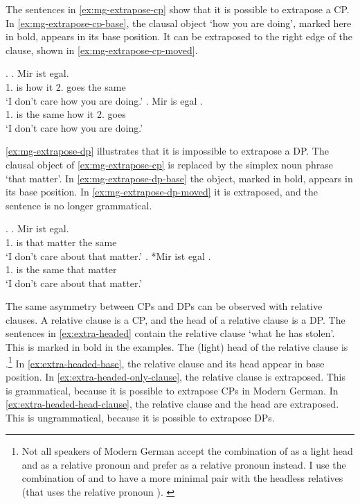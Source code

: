 The sentences in \ref{ex:mg-extrapose-cp} show that it is possible to extrapose a CP. In \ref{ex:mg-extrapose-cp-base}, the clausal object  `how you are doing', marked here in bold, appears in its base position. It can be extraposed to the right edge of the clause, shown in \ref{ex:mg-extrapose-cp-moved}.

\ex.\label{ex:mg-extrapose-cp}
\ag. Mir ist     egal.\\
1. is how it 2. goes {the same}\\
`I don't care how you are doing.'\label{ex:mg-extrapose-cp-base}
\bg. Mir is egal    .\\
1. is {the same} how it 2. goes\\
`I don't care how you are doing.' \label{ex:mg-extrapose-cp-moved}

\ref{ex:mg-extrapose-dp} illustrates that it is impossible to extrapose a DP. The clausal object of \ref{ex:mg-extrapose-cp} is replaced by the simplex noun phrase  `that matter'.
In \ref{ex:mg-extrapose-dp-base} the object, marked in bold, appears in its base position. In \ref{ex:mg-extrapose-dp-moved} it is extraposed, and the sentence is no longer grammatical.

\ex.\label{ex:mg-extrapose-dp}
\ag. Mir ist   egal.\\
1. is that matter {the same}\\
`I don't care about that matter.'\label{ex:mg-extrapose-dp-base}
\bg. *Mir ist egal  .\\
1. is {the same} that matter\\
`I don't care about that matter.' \label{ex:mg-extrapose-dp-moved}

The same asymmetry between CPs and DPs can be observed with relative clauses. A relative clause is a CP, and the head of a relative clause is a DP. The sentences in \ref{ex:extra-headed} contain the relative clause  `what he has stolen'. This is marked in bold in the examples. The (light) head of the relative clause is .\footnote{
Not all speakers of Modern German accept the combination of  as a light head and  as a relative pronoun and prefer  as a relative pronoun instead. I use the combination of  and  to have a more minimal pair with the headless relatives (that uses the relative pronoun ).
\label{ftn:das-was}
}
In \ref{ex:extra-headed-base}, the relative clause and its head appear in base position. In \ref{ex:extra-headed-only-clause}, the relative clause is extraposed. This is grammatical, because it is possible to extrapose CPs in Modern German. In \ref{ex:extra-headed-head-clause}, the relative clause and the head are extraposed. This is ungrammatical, because it is possible to extrapose DPs.

